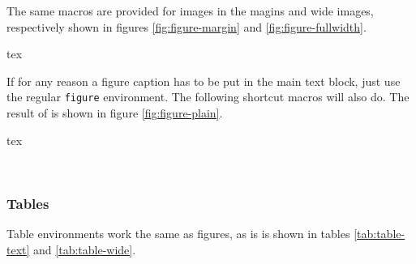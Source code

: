 \documentclass[
	raggedright,
	12pt,
	colorful,
]{tufte-style-article}
\begin{document}
The same macros are provided for images in the magins and wide images, respectively shown in figures \ref{fig:figure-margin} and \ref{fig:figure-fullwidth}.

\begin{codebox}{tex}
\end{codebox}



If for any reason a figure caption has to be put in the main text block, just use the regular \texttt{figure} environment. The following shortcut macros will also do. The result of  is shown in figure \ref{fig:figure-plain}.

\begin{codebox}{tex}
\end{codebox}

\newpage~


\FloatBarrier
\subsubsection{Tables}

Table environments work the same as figures, as is is shown in tables \ref{tab:table-text} and \ref{tab:table-wide}.
\end{document}
